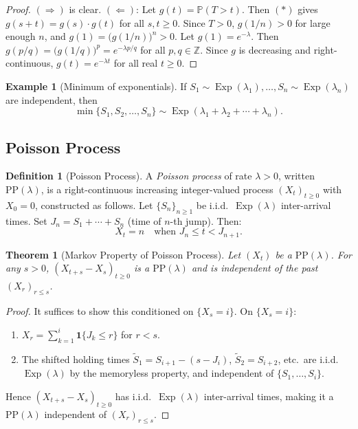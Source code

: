 \documentclass[12pt, a4paper]{article}
\theoremstyle{definition}
\newtheorem{definition}{Definition}[section]
\newtheorem{example}{Example}[section]
\theoremstyle{plain}
\newtheorem{theorem}{Theorem}[section]
\DeclareMathOperator{\Exp}{Exp}
\newcommand{\PP}{\mathbb{P}}
\begin{document}
\begin{proof}
$(\Rightarrow)$ is clear. $(\Leftarrow)$: Let $g(t)=\PP(T>t)$. Then $(*)$ gives $g(s+t)=g(s)\cdot g(t)$ for all $s,t\ge 0$. Since $T>0$, $g(1/n)>0$ for large enough $n$, and $g(1)=\bigl(g(1/n)\bigr)^n>0$. Let $g(1)=e^{-\lambda}$. Then $g(p/q)=\bigl(g(1/q)\bigr)^p=e^{-\lambda p/q}$ for all $p,q\in\mathbb{Z}$. Since $g$ is decreasing and right-continuous, $g(t)=e^{-\lambda t}$ for all real $t\ge 0$.
\end{proof}

\begin{example}[Minimum of exponentials]
If $S_1\sim\Exp(\lambda_1),\ldots,S_n\sim\Exp(\lambda_n)$ are independent, then
\[
  \min\{S_1,S_2,\ldots,S_n\} \sim \Exp(\lambda_1+\lambda_2+\cdots+\lambda_n).
\]
\end{example}

\subsection{Poisson Process}

\begin{definition}[Poisson Process]
A \emph{Poisson process} of rate $\lambda>0$, written $\text{PP}(\lambda)$, is a right-continuous increasing integer-valued process $(X_t)_{t\ge 0}$ with $X_0=0$, constructed as follows. Let $\{S_n\}_{n\ge 1}$ be i.i.d.\ $\Exp(\lambda)$ inter-arrival times. Set $J_n = S_1+\cdots+S_n$ (time of $n$-th jump). Then:
\[
  X_t = n \quad\text{when } J_n\le t < J_{n+1}.
\]
\end{definition}

\begin{theorem}[Markov Property of Poisson Process]
Let $(X_t)$ be a $\text{PP}(\lambda)$. For any $s>0$, $(X_{t+s}-X_s)_{t\ge 0}$ is a $\text{PP}(\lambda)$ and is independent of the past $(X_r)_{r\le s}$.
\end{theorem}

\begin{proof}
It suffices to show this conditioned on $\{X_s=i\}$. On $\{X_s=i\}$:
\begin{enumerate}[label=(\roman*)]
  \item $X_r = \sum_{k=1}^{i}\mathbf{1}\{J_k\le r\}$ for $r<s$.
  \item The shifted holding times $\tilde{S}_1 = S_{i+1}-(s-J_i)$, $\tilde{S}_2=S_{i+2}$, etc.\ are i.i.d.\ $\Exp(\lambda)$ by the memoryless property, and independent of $\{S_1,\ldots,S_i\}$.
\end{enumerate}
Hence $(X_{t+s}-X_s)_{t\ge 0}$ has i.i.d.\ $\Exp(\lambda)$ inter-arrival times, making it a $\text{PP}(\lambda)$ independent of $(X_r)_{r\le s}$.
\end{proof}
\end{document}
